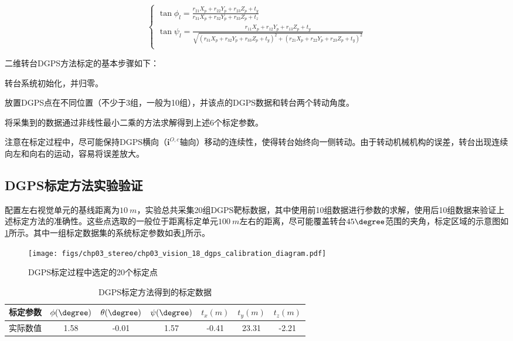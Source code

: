 \begin{equation}
\left\{ \begin{gathered}
\tan \phi_l= \frac{r_{21}X_p + r_{22}Y_p + r_{23}Z_p + t_y}{r_{31}X_p + r_{32}Y_p + r_{33}Z_p + t_z} \\
\tan \psi_l= \frac{r_{11}X_p + r_{12}Y_p + r_{13}Z_p + t_y}{\sqrt{(r_{31}X_p + r_{32}Y_p + r_{33}Z_p + t_y)^2+(r_{21}X_p + r_{22}Y_p + r_{23}Z_p + t_y)^2} }\\
\end{gathered}  \right.
\end{equation}

二维转台DGPS方法标定的基本步骤如下：
\begin{compactenum}
	\item
	转台系统初始化，并归零。
	\item
	放置DGPS点在不同位置（不少于3组，一般为10组），并该点的DGPS数据和转台两个转动角度。
	\item
	将采集到的数据通过非线性最小二乘的方法求解得到上述6个标定参数。
\end{compactenum}
注意在标定过程中，尽可能保持DGPS横向（$\mathbf{i}^{O,c}$轴向）移动的连续性，使得转台始终向一侧转动。由于转动机械机构的误差，转台出现连续向左和向右的运动，容易将误差放大。

\subsection{DGPS标定方法实验验证}
配置左右视觉单元的基线距离为$10\ m$，实验总共采集20组DGPS靶标数据，其中使用前10组数据进行参数的求解，使用后10组数据来验证上述标定方法的准确性。这些点选取的一般位于距离标定单元$100\ m$左右的距离，尽可能覆盖转台$45\degree$范围的夹角，标定区域的示意图如\ref{fig:chp03_vision_18_dgps_calibration_diagram}所示。其中一组标定数据集的系统标定参数如表\ref{label:dgps_calibration}所示。

\begin{figure}[htb]
	\centering
	\texttt{[image: figs/chp03\_stereo/chp03\_vision\_18\_dgps\_calibration\_diagram.pdf]}	
	\caption{DGPS标定过程中选定的20个标定点}
	\label{fig:chp03_vision_18_dgps_calibration_diagram}
\end{figure}

\begin{table}[htb]
	\centering
	\caption{DGPS标定方法得到的标定数据}
	\label{label:dgps_calibration}
	\begin{tabular}{ccccccc}
		\hline
		标定参数 & $\phi (\degree)$ & $\theta (\degree)$ & $\psi (\degree)$ & $t_x (m)$ & $t_y(m)$ & $t_z(m)$ \\ \hline
		实际数值 & 1.58             & -0.01              & 1.57             & -0.41     & 23.31   & -2.21    \\ \hline
	\end{tabular}
\end{table}

